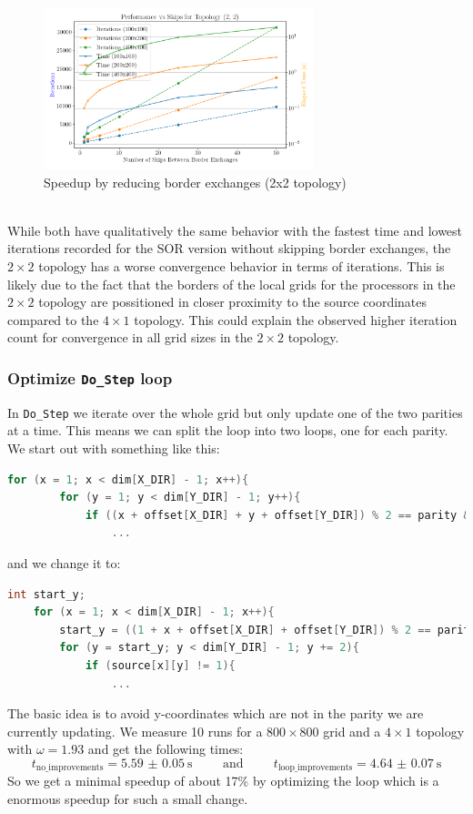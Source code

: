 \begin{figure}[H]
    \centering
    \includegraphics[width=0.7\textwidth]{../fig/lab1/skips_topology_2x2.png}
    \caption{Speedup by reducing border exchanges (2x2 topology)}
    \label{fig:border_speedup2}
\end{figure}
\\
While both have qualitatively the same behavior with the fastest time and lowest iterations recorded for the SOR version without skipping border exchanges, the $2\times 2$ topology has a worse convergence behavior in terms of iterations. This is likely due to the fact that the borders of the local grids for the processors in the $2\times 2$ topology are possitioned in closer proximity to the source coordinates compared to the $4\times 1$ topology. This could explain the observed higher iteration count for convergence in all grid sizes in the $2\times 2$ topology.
\subsubsection{Optimize \texttt{Do\_Step} loop}

In \texttt{Do\_Step} we iterate over the whole grid but only update one of the two parities at a time. This means we can split the loop into two loops, one for each parity. We start out with something like this:
\begin{lstlisting}[language=c]
    for (x = 1; x < dim[X_DIR] - 1; x++){
        for (y = 1; y < dim[Y_DIR] - 1; y++){
            if ((x + offset[X_DIR] + y + offset[Y_DIR]) % 2 == parity && source[x][y] != 1){
                ...
\end{lstlisting}
and we change it to:
\begin{lstlisting}[language=c]
    int start_y;
    for (x = 1; x < dim[X_DIR] - 1; x++){
        start_y = ((1 + x + offset[X_DIR] + offset[Y_DIR]) % 2 == parity) ? 1 : 2;
        for (y = start_y; y < dim[Y_DIR] - 1; y += 2){
            if (source[x][y] != 1){
                ...
\end{lstlisting}
The basic idea is to avoid y-coordinates which are not in the parity we are currently updating. 
We measure 10 runs for a $800 \times 800$ grid and a $4 \times 1$ topology with $\omega = 1.93$ and get the following times: 
\[t_{\text{no\_improvements}} = \SI{5.59(5)}{\second}\hspace{1cm}\text{and}\hspace{1cm}t_{\text{loop\_improvements}} = \SI{4.64(7)}{\second}\]
So we get a minimal speedup of about 17\% by optimizing the loop which is a enormous speedup for such a small change.

